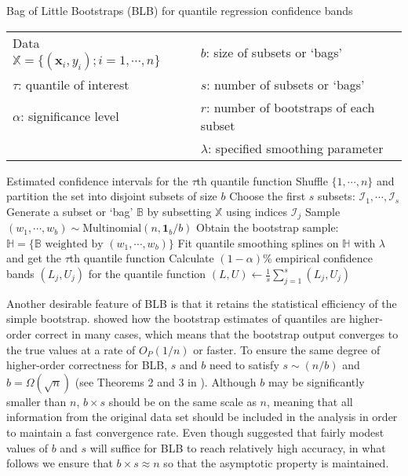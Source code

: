 \documentclass{statsoc}
\begin{document}
\begin{algorithm}
\caption{Bag of Little Bootstraps (BLB\citep{kleiner2014scalable}) for quantile regression confidence bands}\label{BLB}
\begin{algorithmic}[1]
\Require \begin{tabular}{ll}
     Data $\mathbb{X}=\{(\mathbf{x}_i,y_i);i=1,\cdots,n\}$\qquad\qquad&$b$: size of subsets or `bags'\\
    $\tau$: quantile of interest&$s$: number of subsets or `bags'\\
   $\alpha$: significance level&$r$: number of bootstraps of each subset\\
   &$\lambda$: specified smoothing parameter
\end{tabular}
\Ensure Estimated confidence intervals for the $\tau$th quantile function
   \State Shuffle $\{1,\cdots,n\}$ and partition the set into disjoint subsets of size $b$ 
   \State Choose the first $s$ subsets: $\mathcal{I}_1,\cdots,\mathcal{I}_s$
      \State Generate a subset or `bag' $\mathbb{B}$ by subsetting $\mathbb{X}$ using indices $\mathcal{I}_j$
         \State Sample $(w_1,\cdots,w_b)\sim \text{Multinomial}(n,\mathbf{1}_b/b)$ 
         \State Obtain the bootstrap sample: $\mathbb{H}=\{\mathbb{B}\text{ weighted by }(w_1,\cdots,w_b)\}$\label{blah2}
         \State Fit quantile smoothing splines on $\mathbb{H}$ with $\lambda$ and get the $\tau$th quantile function\label{blah}
      \EndFor
      \State Calculate $(1-\alpha)$\% empirical confidence bands $(L_j,U_j)$ for the quantile function
   \EndFor
   \State $(L,U) \leftarrow \frac{1}{s}\sum_{j=1}^s{(L_j,U_j)}$ 
\end{algorithmic}
\end{algorithm}

Another desirable feature of BLB is that it retains the statistical efficiency of the simple bootstrap. \citet{hall2013bootstrap} showed how the bootstrap estimates of quantiles are higher-order correct in many cases, which means that the bootstrap output converges to the true values at a rate of $O_P(1/n)$ or faster. To ensure the same degree of higher-order correctness for BLB, $s$ and $b$ need to satisfy $s\sim (n/b)$ and $b=\Omega(\sqrt{n})$ (see Theorems 2 and 3 in \citet{kleiner2014scalable}). Although $b$ may be significantly smaller than $n$, $b\times s$ should be on the same scale as $n$, meaning that all information from the original data set should be included in the analysis in order to maintain a fast convergence rate. Even though \citet{kleiner2014scalable} suggested that fairly modest values of $b$ and $s$ will suffice for BLB to reach relatively high accuracy, in what follows we ensure that $b\times s\approx n$ so that the asymptotic property is maintained.
\end{document}
